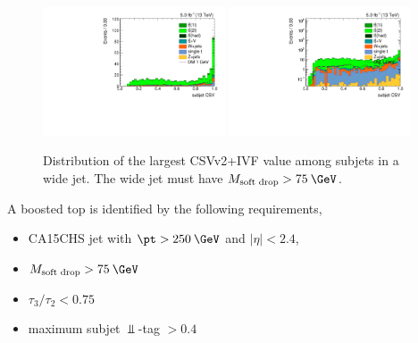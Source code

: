 \begin{figure}[htbp]
  \centering
  \includegraphics[width=0.48\textwidth]{figures/subjetbtag.pdf}
  \includegraphics[width=0.48\textwidth]{figures/subjetbtaglog.pdf}
  \caption{Distribution of the largest CSVv2+IVF value among subjets in a wide jet. The wide jet must have $M_{\mbox{\scriptsize{soft drop}}}>75\:\GeV$.}
  \label{fig:subjet_btag}
\end{figure}

A boosted top is identified by the following requirements, 
\begin{itemize}
\item CA15CHS jet with $\pt>250\:\GeV$ and $|\eta|<2.4$,
\item $M_{\mbox{\scriptsize{soft drop}}} > 75\:\GeV$
\item $\tau_3/\tau_2 < 0.75$
\item maximum subjet $\Bot$-tag $> 0.4$
\end{itemize}
